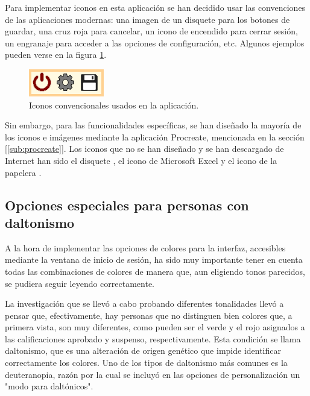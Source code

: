 Para implementar iconos en esta aplicación se han decidido usar las convenciones de las aplicaciones modernas: una imagen de un disquete para los botones de guardar, una cruz roja para cancelar, un icono de encendido para cerrar sesión, un engranaje para acceder a las opciones de configuración, etc. Algunos ejemplos pueden verse en la figura \ref{Fig:iconosusados}.

\begin{figure}[h]
\centering\includegraphics[width=1\linewidth]{figs/iconosusados.png}
\caption{Iconos convencionales usados en la aplicación.}
\label{Fig:iconosusados}
\end{figure}

Sin embargo, para las funcionalidades específicas, se han diseñado la mayoría de los iconos e imágenes mediante la aplicación Procreate, mencionada en la sección [\ref{sub:procreate}]. Los iconos que no se han diseñado y se han descargado de Internet han sido el disquete \cite{disquete}, el icono de Microsoft Excel \cite{excelicon} y el icono de la papelera \cite{iconsforfree}.

\subsection{Opciones especiales para personas con daltonismo}
A la hora de implementar las opciones de colores para la interfaz, accesibles mediante la ventana de inicio de sesión, ha sido muy importante tener en cuenta todas las combinaciones de colores de manera que, aun eligiendo tonos parecidos, se pudiera seguir leyendo correctamente.

La investigación que se llevó a cabo probando diferentes tonalidades  llevó a pensar que, efectivamente, hay personas que no distinguen bien colores que, a primera vista, son muy diferentes, como pueden ser el verde y el rojo asignados a las calificaciones aprobado y suspenso, respectivamente. Esta condición se llama daltonismo, que es una alteración de origen genético que impide identificar correctamente los colores. Uno de los tipos de daltonismo más comunes es la deuteranopia, razón por la cual se incluyó en las opciones de personalización un "modo para daltónicos".

